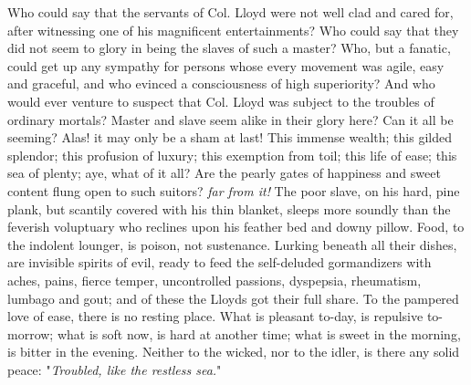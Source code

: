 Who could say that the servants of Col. Lloyd were not well clad and
cared for, after witnessing one of his magnificent entertainments? Who
could say that they did not seem to glory in being the slaves of such a
master? Who, but a fanatic, could get up any sympathy for persons whose
every movement was agile, easy and graceful, and who evinced a
consciousness of high superiority? And who would ever venture to suspect
that Col. Lloyd was subject to the troubles of ordinary mortals? Master
and slave seem alike in their glory here? Can it all be seeming? Alas!
it may only be a sham at last! This immense wealth; this gilded
splendor; this profusion of luxury; this exemption from toil; this life
of ease; this sea of plenty; aye, what of it all? Are the pearly gates
of happiness and sweet content flung open to such suitors? \emph{far
from it!} The poor slave, on his hard, pine plank, but scantily covered
with his thin blanket, sleeps more soundly than the feverish voluptuary
who reclines upon his feather bed and downy pillow. Food, to the
indolent lounger, is poison, not sustenance. Lurking beneath all their
dishes, are invisible spirits of evil, ready to feed the self-deluded
gormandizers with aches, pains, fierce temper, uncontrolled passions,
dyspepsia, rheumatism, lumbago and gout; and {}of these the Lloyds got
their full share. To the pampered love of ease, there is no resting
place. What is pleasant to-day, is repulsive to-morrow; what is soft
now, is hard at another time; what is sweet in the morning, is bitter in
the evening. Neither to the wicked, nor to the idler, is there any solid
peace: "\emph{Troubled, like the restless sea.}"

